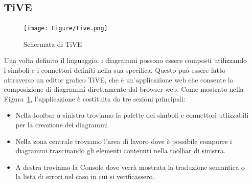         \subsection{TiVE}

            \begin{figure}[htbp]
                \centering
                \texttt{[image: Figure/tive.png]}
                \caption{Schermata di TiVE}
                \label{fig:tive}
            \end{figure}

            Una volta definito il linguaggio, i diagrammi possono essere composti utilizzando i simboli e i connettori definiti nella sua specifica. Questo può essere fatto attraverso un editor grafico TiVE, che è un'applicazione web che consente la composizione di diagrammi direttamente dal browser web.
            \newline
            Come mostrato nella Figura~\ref{fig:tive}, l'applicazione è costituita da tre sezioni principali:
            \begin{itemize}
                \item Nella toolbar a sinistra troviamo la palette dei simboli e connettori utlizzabili per la creazione dei diagrammi.
                \item Nella zona centrale troviamo l'area di lavoro dove è possibile comporre i diagrammi trascinando gli elementi contenuti nella toolbar di sinistra.
                \item A destra troviamo la Console dove verrà mostrata la traduzione semantica o la lista di errori nel caso in cui si verificassero.
            \end{itemize}


